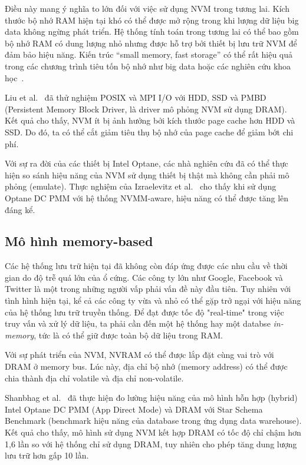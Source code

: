 Điều này mang ý nghĩa to lớn đối với việc sử dụng NVM trong tương lai. Kích
thước bộ nhớ RAM hiện tại khó có thể được mở rộng trong khi lượng dữ liệu big
data không ngừng phát triển. Hệ thống tính toán trong tương lai có thể bao gồm
bộ nhớ RAM có dung lượng nhỏ nhưng được hỗ trợ bởi thiết bị lưu trữ NVM để đảm
bảo hiệu năng. Kiến trúc ``small memory, fast storage'' có thể rất hiệu quả
trong các chương trình tiêu tốn bộ nhớ như big data hoặc các nghiên cứu khoa
học~\cite{bahnImplicationsNVMBased2020}.

Liu et al.~\cite{liuPerformanceEvaluationModeling2017} đã thử nghiệm POSIX và
MPI I/O với HDD, SSD và PMBD (Persistent Memory Block Driver, là driver mô phỏng
NVM sử dụng DRAM). Kết quả cho thấy, NVM ít bị ảnh hưởng bởi kích thước page
cache hơn HDD và SSD. Do đó, ta có thể cắt giảm tiêu thụ bộ nhớ của page cache
để giảm bớt chi phí.

Với sự ra đời của các thiết bị Intel Optane, các nhà nghiên cứu đã có thể thực
hiện so sánh hiệu năng của NVM sử dụng thiết bị thật mà không cần phải mô phỏng
(emulate). Thực nghiệm của Izraelevitz et
al.~\cite{izraelevitzBasicPerformanceMeasurements2019} cho thấy khi sử dụng
Optane DC PMM với hệ thống NVMM-aware, hiệu năng có thể được tăng lên đáng kể.

\subsection{Mô hình memory-based}
Các hệ thống lưu trữ hiện tại đã không còn đáp ứng được các nhu cầu về thời gian
do độ trễ quá lớn của ổ cứng. Các công ty lớn như Google, Facebook và Twitter là
một trong những người vấp phải vấn đề này đầu tiên. Tuy nhiên với tình hình hiện
tại, kể cả các công ty vừa và nhỏ có thể gặp trở ngại với hiệu năng của hệ thống
lưu trữ truyền thống. Để đạt được tốc độ "real-time" trong việc truy vấn và xử
lý dữ liệu, ta phải cần đến một hệ thống hay một databse \textit{in-memory}, tức
là có thể giữ được toàn bộ dữ liệu trong RAM.

Với sự phát triển của NVM, NVRAM có thể được lắp đặt cùng vai trò với DRAM ở
memory bus. Lúc này, địa chỉ bộ nhớ (memory address) có thể được chia thành địa
chỉ volatile và địa chỉ non-volatile.

Shanbhag et al.~\cite{shanbhagLargescaleInmemoryAnalytics2020} đã
thực hiện đo lường hiệu năng của mô hình hỗn hợp (hybrid) Intel Optane DC PMM
(App Direct Mode) và DRAM với Star Schema Benchmark (benchmark hiệu năng của
database trong ứng dụng data warehouse). Kết quả cho thấy, mô hình sử dụng NVM
kết hợp DRAM có tốc độ chỉ chậm hơn 1,6 lần so với hệ thống chỉ sử dụng DRAM,
tuy nhiên cho phép tăng dung lượng lưu trữ hơn gấp 10 lần.

